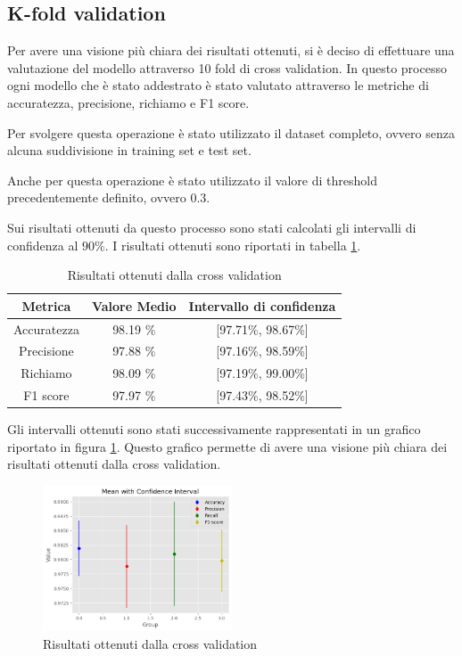 \subsection*{K-fold validation}
Per avere una visione più chiara dei risultati ottenuti, si è deciso di effettuare
una valutazione del modello attraverso 10 fold di cross validation. In questo
processo ogni modello che è stato addestrato è stato valutato attraverso le
metriche di accuratezza, precisione, richiamo e F1 score.

Per svolgere questa operazione è stato utilizzato il dataset completo, ovvero
senza alcuna suddivisione in training set e test set. 

Anche per questa operazione è stato utilizzato il valore di threshold precedentemente
definito, ovvero $0.3$.

Sui risultati ottenuti da questo processo sono stati calcolati gli intervalli
di confidenza al $90\%$. I risultati ottenuti sono riportati in tabella 
\ref{tab:risultatiCrossValidation}.

\begin{table}[ht]
    \centering
    \begin{tabular}{|c|c|c|}
        \hline
        \textbf{Metrica} & \textbf{Valore Medio} & \textbf{Intervallo di confidenza} \\
        \hline
        Accuratezza      & 98.19 \%        & [97.71\%, 98.67\%]                \\
        \hline
        Precisione       & 97.88 \%        & [97.16\%, 98.59\%]                \\
        \hline
        Richiamo         & 98.09 \%        & [97.19\%, 99.00\%]                \\
        \hline
        F1 score         & 97.97 \%        & [97.43\%, 98.52\%]                \\
        \hline
    \end{tabular}
    \caption{Risultati ottenuti dalla cross validation}
    \label{tab:risultatiCrossValidation}
\end{table}

Gli intervalli ottenuti sono stati successivamente rappresentati in un grafico
riportato in figura \ref{fig:risultatiCrossValidation}. Questo grafico permette
di avere una visione più chiara dei risultati ottenuti dalla cross validation.

\begin{figure}[!ht]
    \centering
    \includegraphics[width=0.5\textwidth]{img/rete/intervalli_confidenza.png}
    \caption{Risultati ottenuti dalla cross validation}
    \label{fig:risultatiCrossValidation}
\end{figure}

